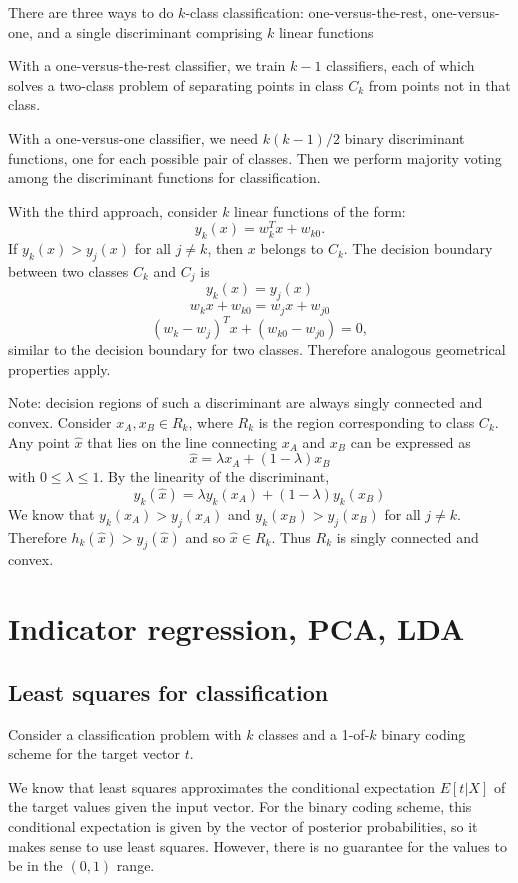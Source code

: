 \documentclass[a4paper,12pt]{article}
\begin{document}
There are three ways to do $k$-class classification: one-versus-the-rest, one-versus-one, and a single discriminant comprising $k$ linear functions

With a one-versus-the-rest classifier, we train $k-1$ classifiers, each of which solves a two-class problem of separating points in class $C_k$ from points not in that class. 

With a one-versus-one classifier, we need $k(k-1)/2$ binary discriminant functions, one for each possible pair of classes. Then we perform majority voting among the discriminant functions for classification. 

With the third approach, consider $k$ linear functions of the form: 
$$y_k(x) = w_k^Tx + w_{k0}.$$
If $y_k(x) > y_j(x)$ for all $j\neq k$, then $x$ belongs to $C_k$. The decision boundary between two classes $C_k$ and $C_j$ is 
$$y_k(x) = y_j(x)$$
$$w_kx + w_{k0} = w_jx + w_{j0}$$
$$(w_k - w_j)^Tx + (w_{k0}-w_{j0}) = 0,$$
similar to the decision boundary for two classes. Therefore analogous geometrical properties apply. 

Note: decision regions of such a discriminant are always singly connected and convex. Consider $x_A, x_B \in R_k$, where $R_k$ is the region corresponding to class $C_k$. Any point $\hat x$ that lies on the line connecting $x_A$ and $x_B$ can be expressed as 
$$\hat x = \lambda x_A + (1-\lambda)x_B$$
with $0\leq\lambda\leq1$. By the linearity of the discriminant, 
$$y_k(\hat x) = \lambda y_k(x_A)+ (1-\lambda) y_k(x_B)$$
We know that $y_k(x_A)>y_j(x_A)$ and $y_k(x_B)>y_j(x_B)$ for all $j\neq k$. Therefore $h_k(\hat x) > y_j(\hat x)$ and so $\hat x \in R_k$. Thus $R_k$ is singly connected and convex. 



\clearpage

\section{Indicator regression, PCA, LDA}

\subsection{Least squares for classification}

Consider a classification problem with $k$ classes and a 1-of-$k$ binary coding scheme for the target vector $t$. 

We know that least squares approximates the conditional expectation $E[t|X]$ of the target values given the input vector. For the binary coding scheme, this conditional expectation is given by the vector of posterior probabilities, so it makes sense to use least squares. However, there is no guarantee for the values to be in the $(0, 1)$ range. 
\end{document}

